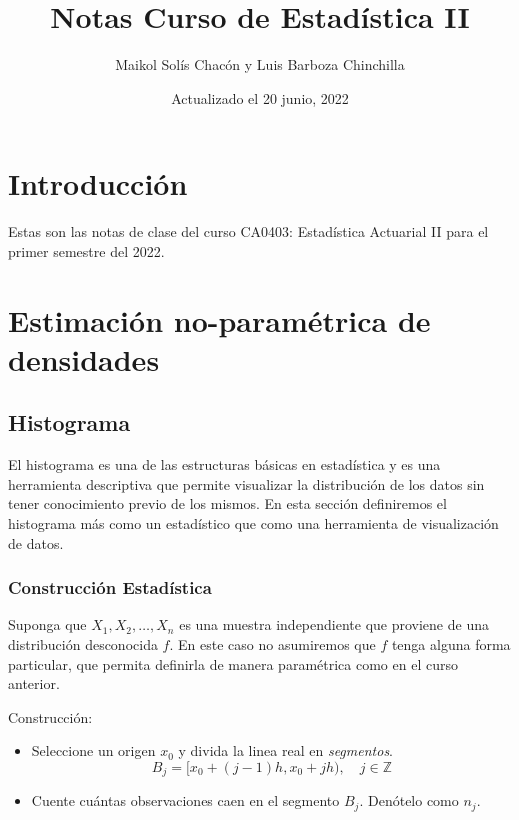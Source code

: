\documentclass[
  12pt,
]{book}
\title{Notas Curso de Estadística II}
\author{Maikol Solís Chacón y Luis Barboza Chinchilla}
\date{Actualizado el 20 junio, 2022}
\theoremstyle{definition}
\theoremstyle{definition}
\theoremstyle{definition}
\theoremstyle{definition}
\theoremstyle{remark}
\begin{document}
\maketitle

{
\hypersetup{linkcolor=}
\setcounter{tocdepth}{4}
\tableofcontents
}
\hypertarget{introducciuxf3n}{%
\chapter{Introducción}\label{introducciuxf3n}}

Estas son las notas de clase del curso CA0403: Estadística Actuarial II para el primer semestre del 2022.

\hypertarget{estimaciuxf3n-no-paramuxe9trica-de-densidades}{%
\chapter{Estimación no-paramétrica de densidades}\label{estimaciuxf3n-no-paramuxe9trica-de-densidades}}

\hypertarget{histograma}{%
\section{Histograma}\label{histograma}}

El histograma es una de las estructuras básicas en estadística y es una herramienta descriptiva que permite visualizar la distribución de los datos sin tener conocimiento previo de los mismos. En esta sección definiremos el histograma más como un estadístico que como una herramienta de visualización de datos.

\hypertarget{construcciuxf3n-estaduxedstica}{%
\subsection{Construcción Estadística}\label{construcciuxf3n-estaduxedstica}}

Suponga que \(X_1,X_2, \dots ,X_n\) es una muestra independiente que proviene de una distribución desconocida \(f\). En este caso no asumiremos que \(f\) tenga alguna forma particular, que permita definirla de manera paramétrica como en el curso anterior.

Construcción:

\begin{itemize}
\item
  Seleccione un origen \(x_0\) y divida la linea real en \emph{segmentos}.
  \begin{equation*}
  B_j = [x_0 +(j - 1)h,x_0 + jh), \quad j\in \mathbb{Z}
  \end{equation*}
\item
  Cuente cuántas observaciones caen en el segmento \(B_j\). Denótelo como \(n_j\).
\end{itemize}
\end{document}
